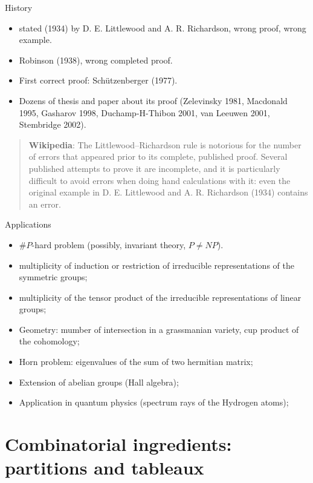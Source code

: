 \documentclass[compress,11pt]{beamer}
\begin{document}
\begin{frame}{History}
  \begin{itemize}
  \item stated (1934) by D. E. Littlewood and A. R. Richardson, wrong proof,
    wrong example.
  \item Robinson (1938), wrong completed proof.
  \item First correct proof: Schützenberger (1977).
  \item Dozens of thesis and paper about its proof (Zelevinsky 1981, Macdonald
    1995, Gasharov 1998, Duchamp-H-Thibon 2001, van Leeuwen 2001, Stembridge
    2002).
  \end{itemize}

  \begin{quotation}\small
    \textbf{Wikipedia}: The Littlewood–Richardson rule is notorious for the
    number of errors that appeared prior to its complete, published
    proof. Several published attempts to prove it are incomplete, and it is
    particularly difficult to avoid errors when doing hand calculations with
    it: even the original example in D. E. Littlewood and A. R. Richardson
    (1934) contains an error.
 \end{quotation}
\end{frame}

\begin{frame}{Applications}
  \begin{itemize}
  \item $\#P$-hard problem (possibly, invariant theory, $P \neq NP$).
  \item multiplicity of induction or restriction of irreducible representations
    of the symmetric groups;
  \item multiplicity of the tensor product of the irreducible representations
    of linear groups;
  \item Geometry: mumber of intersection in a grassmanian variety, cup product
    of the cohomology;
  \item Horn problem: eigenvalues of the sum of two hermitian matrix;
  \item Extension of abelian groups (Hall algebra);
  \item Application in quantum physics (spectrum rays of the Hydrogen atoms);
  \end{itemize}
\end{frame}

\section{Combinatorial ingredients: partitions and tableaux}
\end{document}
